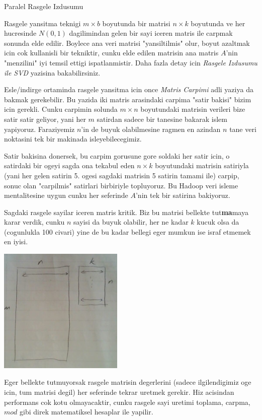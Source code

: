 \documentclass[12pt,fleqn]{article}\usepackage{../common}
\begin{document}
Paralel Rasgele Izdusumu

Rasgele yansitma teknigi $m \times b$ boyutunda bir matrisi $n \times
k$ boyutunda ve her hucresinde $N(0,1)$ dagilimindan gelen bir sayi
iceren matris ile carpmak sonunda elde edilir. Boylece ana veri
matrisi "yansiltilmis" olur, boyut azaltmak icin cok kullanisli bir
tekniktir, cunku elde edilen matrisin ana matris $A$'nin "menzilini"
iyi temsil ettigi ispatlanmistir. Daha fazla detay icin {\em Rasgele
Izdusumu ile SVD} yazisina bakabilirsiniz.

Esle/indirge ortaminda rasgele yansitma icin once {\em Matris
Carpimi} adli yaziya da bakmak gerekebilir. Bu yazida iki matris
arasindaki carpima "satir bakisi" bizim icin gerekli. Cunku carpimin
solunda $m \times n$ boyutundaki matrisin verileri bize satir satir
geliyor, yani her $m$ satirdan sadece bir tanesine bakarak islem
yapiyoruz. Faraziyemiz $n$'in de buyuk olabilmesine ragmen en azindan
$n$ tane veri noktasini tek bir makinada isleyebilecegimiz.

Satir bakisina donersek, bu carpim gorusune gore soldaki her satir
icin, o satirdaki bir ogeyi sagda ona tekabul eden $n \times k$
boyutundaki matrisin satiriyla (yani her gelen satirin 5. ogesi
sagdaki matrisin 5 satirin tamami ile) carpip, sonuc olan "carpilmis"
satirlari birbiriyle topluyoruz. Bu Hadoop veri isleme mentalitesine
uygun cunku her seferinde $A$'nin tek bir satirina bakiyoruz.

Sagdaki rasgele sayilar iceren matris kritik. Biz bu matrisi bellekte
tut\textbf{ma}maya karar verdik, cunku $n$ sayisi da buyuk olabilir, her
ne kadar $k$ kucuk olsa da (cogunlukla 100 civari) yine de bu kadar
bellegi eger mumkun ise israf etmemek en iyisi.

\includegraphics[height=6cm]{proj.png}


Eger bellekte tutmuyorsak rasgele matrisin degerlerini (sadece
ilgilendigimiz oge icin, tum matrisi degil) her seferinde tekrar
uretmek gerekir. Hiz acisindan performans cok kotu olmayacaktir, cunku
rasgele sayi uretimi toplama, carpma, $mod$ gibi direk matematiksel
hesaplar ile yapilir.
\end{document}
